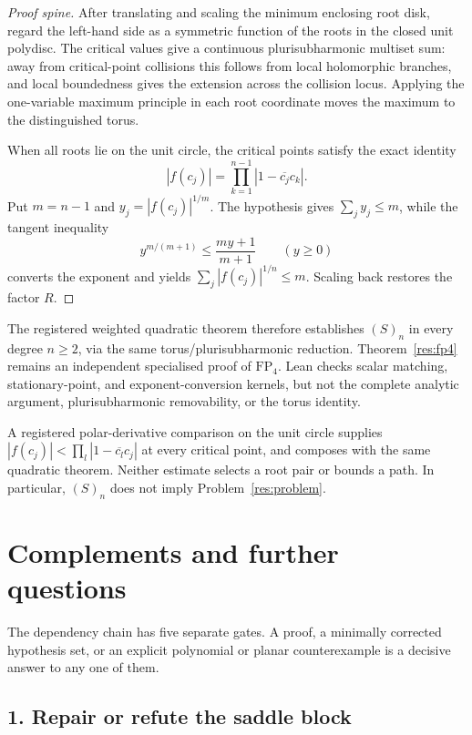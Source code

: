 \begin{proof}[Proof spine]
After translating and scaling the minimum enclosing root disk, regard the
left-hand side as a symmetric function of the roots in the closed unit
polydisc.  The critical values give a continuous plurisubharmonic multiset
sum: away from critical-point collisions this follows from local holomorphic
branches, and local boundedness gives the extension across the collision
locus.  Applying the one-variable maximum principle in each root coordinate
moves the maximum to the distinguished torus.

When all roots lie on the unit circle, the critical points satisfy the exact
identity
\[
 |f(c_j)|=\prod_{k=1}^{n-1}|1-\overline{c_j}c_k|.
\]
Put $m=n-1$ and $y_j=|f(c_j)|^{1/m}$.  The hypothesis gives
$\sum_jy_j\le m$, while the tangent inequality
\[
 y^{m/(m+1)}\le\frac{my+1}{m+1}\qquad(y\ge0)
\]
converts the exponent and yields $\sum_j|f(c_j)|^{1/n}\le m$.  Scaling back
restores the factor $R$.
\end{proof}

The registered weighted quadratic theorem therefore establishes $(S)_n$
in every degree $n\ge2$, via the same torus/plurisubharmonic reduction.
Theorem~\ref{res:fp4} remains an independent specialised proof of
$\mathrm{FP}_4$.  Lean checks scalar matching, stationary-point, and
exponent-conversion kernels, but not the complete analytic argument,
plurisubharmonic removability, or the torus identity.

A registered polar-derivative comparison on the unit circle supplies
$|f(c_j)|<\prod_l|1-\overline{c_l}c_j|$ at every critical point, and
composes with the same quadratic theorem.  Neither estimate selects a
root pair or bounds a path.  In particular, $(S)_n$ does not imply
Problem~\ref{res:problem}.



\section{Complements and further questions}\label{sec:open}

The dependency chain has five separate gates.  A proof, a minimally corrected
hypothesis set, or an explicit polynomial or planar counterexample is a
decisive answer to any one of them.

\subsection*{1. Repair or refute the saddle block}

